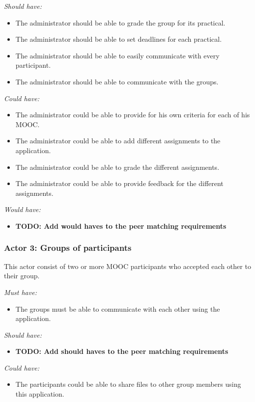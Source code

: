 \documentclass[]{article}
\newcommand{\TODO}[1]{{\color{red}\textbf{TODO: #1}}}
\newcommand{\reqr}[1]{{\noindent\emph{#1:}}}
\begin{document}
\reqr{Should have}
\begin{itemize}
\item The administrator should be able to grade the group for its practical.
\item The administrator should be able to set deadlines for each practical.
\item The administrator should be able to easily communicate with every participant.
\item The administrator should be able to communicate with the groups.
\end{itemize}

\reqr{Could have}
\begin{itemize}
\item The administrator could be able to provide for his own criteria for each of his MOOC.
\item The administrator could be able to add different assignments to the application.
\item The administrator could be able to grade the different assignments.
\item The administrator could be able to provide feedback for the different assignments.
\end{itemize}

\reqr{Would have}
\begin{itemize}
\item \TODO{Add would haves to the peer matching requirements}
\end{itemize}


\subsubsection{Actor 3: Groups of participants}
This actor consist of two or more MOOC participants who accepted each other to their group.

\reqr{Must have}
\begin{itemize}
\item The groups must be able to communicate with each other using the application.
\end{itemize}

\reqr{Should have}
\begin{itemize}
\item \TODO{Add should haves to the peer matching requirements}
\end{itemize}

\reqr{Could have}
\begin{itemize}
\item The participants could be able to share files to other group members using this application.
\end{itemize}
\end{document}

